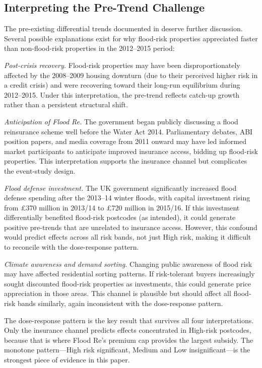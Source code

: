 \documentclass[12pt]{article}
\begin{document}
\subsection{Interpreting the Pre-Trend Challenge}

The pre-existing differential trends documented in  deserve further discussion. Several possible explanations exist for why flood-risk properties appreciated faster than non-flood-risk properties in the 2012--2015 period:

\textit{Post-crisis recovery.} Flood-risk properties may have been disproportionately affected by the 2008--2009 housing downturn (due to their perceived higher risk in a credit crisis) and were recovering toward their long-run equilibrium during 2012--2015. Under this interpretation, the pre-trend reflects catch-up growth rather than a persistent structural shift.

\textit{Anticipation of Flood Re.} The government began publicly discussing a flood reinsurance scheme well before the Water Act 2014. Parliamentary debates, ABI position papers, and media coverage from 2011 onward may have led informed market participants to anticipate improved insurance access, bidding up flood-risk properties. This interpretation supports the insurance channel but complicates the event-study design.

\textit{Flood defense investment.} The UK government significantly increased flood defense spending after the 2013--14 winter floods, with capital investment rising from \pounds370 million in 2013/14 to \pounds720 million in 2015/16. If this investment differentially benefited flood-risk postcodes (as intended), it could generate positive pre-trends that are unrelated to insurance access. However, this confound would predict effects across all risk bands, not just High risk, making it difficult to reconcile with the dose-response pattern.

\textit{Climate awareness and demand sorting.} Changing public awareness of flood risk may have affected residential sorting patterns. If risk-tolerant buyers increasingly sought discounted flood-risk properties as investments, this could generate price appreciation in those areas. This channel is plausible but should affect all flood-risk bands similarly, again inconsistent with the dose-response pattern.

The dose-response pattern is the key result that survives all four interpretations. Only the insurance channel predicts effects concentrated in High-risk postcodes, because that is where Flood Re's premium cap provides the largest subsidy. The monotone pattern---High risk significant, Medium and Low insignificant---is the strongest piece of evidence in this paper.
\end{document}
